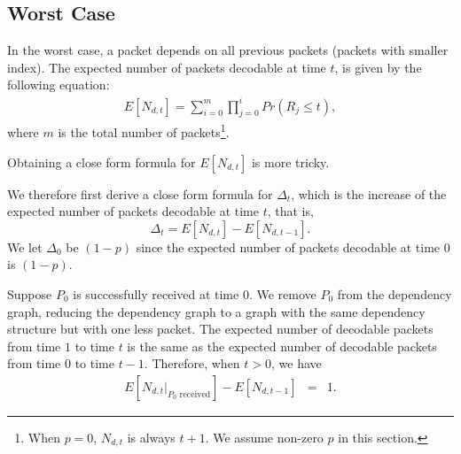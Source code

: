 \subsection{Worst Case}

    

    In the worst case, a packet depends on all previous packets (packets
    with smaller index).  The expected number of packets decodable at
    time $t$, is given by the following equation:
    \begin{eqnarray}
    \label{e:model:endt}
    E[N_{d,t}] = \sum_{i=0}^{m} \prod_{j=0}^i Pr(R_j \le t),
    \end{eqnarray}
    where $m$ is the total number of packets\footnote{When $p=0$, $N_{d,t}$ is always $t+1$.  We assume non-zero $p$ in this section.}.

    Obtaining a close form formula for $E[N_{d,t}]$ is more tricky.
    
    We therefore first derive a close form formula for $\Delta_t$, which is 
    the increase of the expected number of packets decodable at time $t$,
    that is, 
    \begin{displaymath}
        \Delta_t = E[N_{d,t}] - E[N_{d,t-1}]. 
    \end{displaymath}
    We let $\Delta_0$ be $(1-p)$ since
    the expected number of packets decodable at time 0 is $(1-p)$.

    Suppose $P_0$ is successfully received at time $0$.  We remove $P_0$
    from the dependency graph, reducing the dependency graph to a 
    graph with the same dependency structure
    but with one less packet.  The expected number of decodable
    packets from time $1$ to time $t$ is the same as the expected
    number of decodable packets from time $0$ to time $t-1$.  Therefore,
    when $t>0$, we have
    \begin{eqnarray}
    \label{e:model:p0received}
    E[N_{d,t}|_{\textrm{$P_0$ received}}] - E[N_{d,t-1}] &=& 1.%
    \end{eqnarray}

